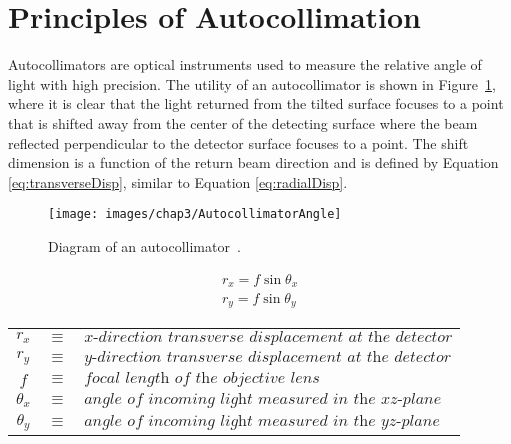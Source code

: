 
\section{Principles of Autocollimation}
\label{sec:principlesOfAutocollimation}

Autocollimators are optical instruments used to measure the relative angle of light with high precision. The utility of an autocollimator is shown in Figure~\ref{fig:autocollAngle}, where it is clear that the light returned from the tilted surface focuses to a point that is shifted away from the center of the detecting surface where the beam reflected perpendicular to the detector surface focuses to a point. The shift dimension is a function of the return beam direction and is defined by Equation \eqref{eq:transverseDisp}, similar to Equation \eqref{eq:radialDisp}.

\begin{figure}[H]		%
\centering
\texttt{[image: images/chap3/AutocollimatorAngle]}
\caption{Diagram of an autocollimator~\cite{microradian}.}
\label{fig:autocollAngle}
\end{figure}

\begin{table}[H]		%
\centering
\begin{subequations}
\label{eq:transverseDisp}
\begin{align}
	r_x = f\sin{\theta_x} \\
	r_y = f\sin{\theta_y}
\end{align}
\end{subequations}
\begin{tabular}{cll}
$r_x$ & $\equiv$ & $\textit{x-direction transverse displacement at the detector}$\\
$r_y$ & $\equiv$ & $\textit{y-direction transverse displacement at the detector}$\\
$f$ & $\equiv$ & $\textit{focal length of the objective lens}$\\
$\theta_x$ & $\equiv$ & $\textit{angle of incoming light measured in the xz-plane}$\\
$\theta_y$ & $\equiv$ & $\textit{angle of incoming light measured in the yz-plane}$
\end{tabular}
\end{table}

